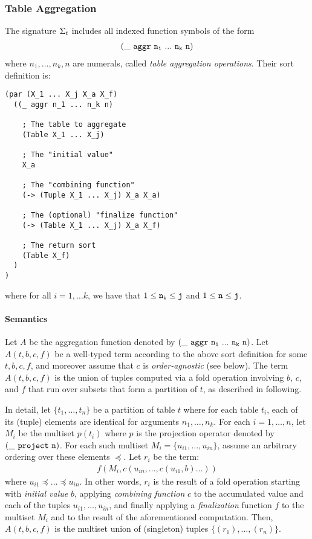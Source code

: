 \documentclass[english,a4paper,10pt]{article}
\begin{document}
\subsubsection{Table Aggregation}
The signature $\Sigma_{t}$ includes 
all indexed function symbols of the form
\begin{align*}
{\tt  
(\_\ aggr\ n_1\ ...\ n_k\ n)
}
\end{align*}
where $n_1, \ldots, n_k, n$ are numerals,
called \emph{table aggregation operations}. Their sort definition is:

\begin{verbatim}
(par (X_1 ... X_j X_a X_f) 
  ((_ aggr n_1 ... n_k n)
  
    ; The table to aggregate
    (Table X_1 ... X_j)
    
    ; The "initial value"
    X_a
    
    ; The "combining function"
    (-> (Tuple X_1 ... X_j) X_a X_a)
    
    ; The (optional) "finalize function"
    (-> (Table X_1 ... X_j) X_a X_f)
    
    ; The return sort
    (Table X_f)
  )
)
\end{verbatim}
where for all $i = 1, \ldots k$,
we have that $1 \leq {\tt n_i} \leq {\tt j}$ and $1 \leq {\tt n} \leq {\tt j}$. 

\paragraph{Semantics}
Let $A$ be the aggregation function
denoted by $
{\tt (\_\ aggr\ n_1\ ...\ n_k\ n)}$.
Let $A( t, b, c, f)$ be a well-typed term
according to the above sort definition for some $t, b, c, f$,
and moreover assume that $c$ is \emph{order-agnostic} (see below).
The term $A( t, b, c, f)$ is
the union of tuples computed via a fold operation involving $b$, $c$, and $f$
that run over subsets that form a partition of $t$, as described in following.

In detail,
let $\{ t_1, \ldots, t_n \}$ be a partition of table $t$
where for each table $t_i$, each of its (tuple) elements
are identical for arguments $n_1, \ldots, n_k$.
For each $i = 1, \ldots, n$,
let $M_i$ be the multiset $p(t_i)$
where $p$ is the projection operator denoted by ${\tt (\_\ project\ n)}$.
For each such multiset $M_i = \{ u_{i1}, \ldots, u_{in} \}$,
assume an arbitrary ordering over these elements $\preceq$.
Let $r_i$ be the term:
\begin{align*}
f( M_i, c( u_{in}, \ldots, c( u_{i1}, b ) \ldots ) )
\end{align*}
where $u_{i1} \preceq \ldots \preceq u_{in}$.
In other words,
$r_i$ is the result of a fold operation
starting with \emph{initial value} $b$,
applying \emph{combining function} $c$ to
the accumulated value and each of the tuples $u_{i1}, \ldots, u_{in}$,
and finally applying a \emph{finalization} function $f$
to the multiset $M_i$ and to the result of the aforementioned computation.
Then,
$A( t, b, c, f)$ is
the multiset union of (singleton) tuples $\{ (r_1), \ldots, (r_n) \}$.
\end{document}

